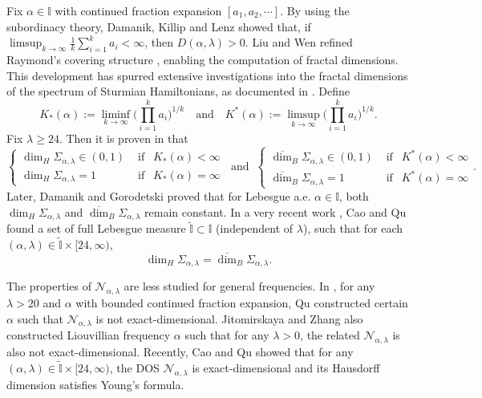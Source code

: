 \documentclass[reqno,11pt,graphicx,]{amsart}
\numberwithin{equation}{section}
\theoremstyle{plain}
\newcommand{\I}{{\mathbb I}}
\newcommand{\3}{\mathbf{3}}
\begin{document}
	Fix $\alpha\in\I$  with continued fraction expansion $[a_1,a_2,\cdots]$. By using the subordinacy theory, Damanik, Killip and Lenz \cite{DKL2000} showed that, if   $\limsup_{k\rightarrow\infty}\frac{1}{k}\sum_{i=1}^k
	a_i<\infty$, then  $D(\alpha,\lambda)>0$.  
	Liu and Wen \cite{LW2004} refined Raymond's covering structure \cite{Ra1997}, enabling the computation of fractal dimensions. This development has spurred extensive investigations into the fractal dimensions of the spectrum of Sturmian Hamiltonians, as documented in \cite{CQ2023,DG2015,FLW2011,LQW2014,LW2004}. Define
	\begin{equation*}\label{K-ast}
		K_\ast(\alpha):=\liminf_{k\rightarrow\infty}
		\Big(\prod_{i=1}^k a_i\Big)^{1/k}\ \ \ \text{ and }\ \ \  K^\ast(\alpha):=
		\limsup_{k\rightarrow\infty}\Big(\prod_{i=1}^k a_i\Big)^{1/k}.
	\end{equation*}
	Fix $\lambda\geq24$. Then it is proven in \cite{LQW2014,LW2004} that
	$$
	\begin{cases}
		\dim_H \Sigma_{\alpha,\lambda} \in(0,1) & \text{ if   }\ \  K_\ast(\alpha)< \infty\\
		\dim_H \Sigma_{\alpha,\lambda} =1 & \text{ if   }\ \  K_\ast(\alpha)= \infty
	\end{cases}
	\ \text{ and }\
	\begin{cases}
		\overline{\dim}_B \Sigma_{\alpha,\lambda} \in(0,1) & \text{ if   }\ \  K^\ast(\alpha)< \infty\\
		\overline{\dim}_B \Sigma_{\alpha,\lambda} =1 & \text{ if   }\ \  K^\ast(\alpha)= \infty
	\end{cases}.
	$$
	Later, Damanik and Gorodetski \cite{DG2015} proved that for Lebesgue a.e. $\alpha\in\I$, both $\dim_H\Sigma_{\alpha,\lambda}$ and
	$\overline{\dim}_B\Sigma_{\alpha,\lambda}$ remain constant. In a very recent work \cite{CQ2023}, Cao and Qu found a set
	of full Lebesgue measure $\tilde{\I}\subset\I$ (independent of $\lambda$), such that for each $(\alpha,\lambda)\in\tilde{\I}\times[24,\infty)$,
	\begin{equation*}
		\dim_{H}\Sigma_{\alpha,\lambda}=\overline{\dim}_B\Sigma_{\alpha,\lambda}.
	\end{equation*}
	
	The properties of $\mathcal{N}_{\alpha,\lambda}$ are less studied for general frequencies. In \cite{Qu2018}, for any $\lambda>20$ and $\alpha$ with bounded continued fraction expansion, Qu constructed certain $\alpha$ such that $\mathcal{N}_{\alpha,\lambda}$ is not exact-dimensional. Jitomirskaya and Zhang \cite{JZ2022} also constructed Liouvillian frequency $\alpha$ such that for any $\lambda>0$, the related $\mathcal{N}_{\alpha,\lambda}$ is also not exact-dimensional. Recently, Cao and Qu \cite{CQ2023} showed that for any $(\alpha,\lambda)\in\tilde{\I}\times[24,\infty)$, the DOS $\mathcal{N}_{\alpha,\lambda}$ is exact-dimensional and its Hausdorff dimension satisfies Young's formula.
\end{document}

